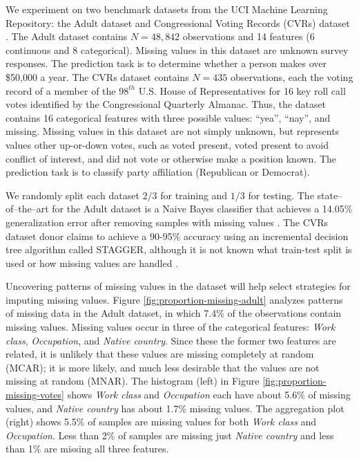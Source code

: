 \documentclass[10pt]{book}
\theoremstyle{definition}
\begin{document}
\par


\setcounter{chapter}{3}
\setcounter{equation}{0} %



We experiment on two benchmark datasets from the UCI Machine Learning Repository: the Adult dataset and Congressional Voting Records (CVRs) dataset \citep{Lichman2013}. The Adult dataset contains $N=48,842$ observations and 14 features (6 continuous and 8 categorical). Missing values in this dataset are unknown survey responses. The prediction task is to determine whether a person makes over \$50,000 a year. The CVRs dataset contains $N=435$ observations, each the voting record of a member of the $98^{th}$ U.S. House of Representatives for 16 key roll call votes identified by the Congressional Quarterly Almanac. Thus, the dataset contains 16 categorical features with three possible values: ``yea'', ``nay'', and missing. Missing values in this dataset are not simply unknown, but represents values other up-or-down votes, such as voted present, voted present to avoid conflict of interest, and did not vote or otherwise make a position known. The prediction task is to classify party affiliation (Republican or Democrat). 

We randomly split each dataset $2/3$ for training and $1/3$ for testing. The state--of--the--art for the Adult dataset is a Naive Bayes classifier that achieves a 14.05\% generalization error after removing samples with missing values \citep{kohavi1996}. The CVRs dataset donor claims to achieve a 90-95\% accuracy using an incremental decision tree algorithm called STAGGER, although it is not known what train-test split is used or how missing values are handled \citep{schlimmer1987,schlimmer1986}.

\par
{}

Uncovering patterns of missing values in the dataset will help select strategies for imputing missing values. Figure \ref{fig:proportion-missing-adult} analyzes patterns of missing data in the Adult dataset, in which 7.4\% of the observations contain missing values. Missing values occur in three of the categorical features: \textit{Work class}, \textit{Occupation}, and \textit{Native country}. Since these the former two features are related, it is unlikely that these values are missing completely at random (MCAR); it is more likely, and much less desirable that the values are not missing at random (MNAR). The histogram (left) in Figure \ref{fig:proportion-missing-votes} shows \textit{Work class} and \textit{Occupation} each have about 5.6\% of missing values, and \textit{Native country} has about 1.7\% missing values. The aggregation plot (right) shows 5.5\% of samples are missing values for both \textit{Work class} and \textit{Occupation}. Less than 2\% of samples are missing just \textit{Native country} and less than 1\% are missing all three features.
\end{document}
